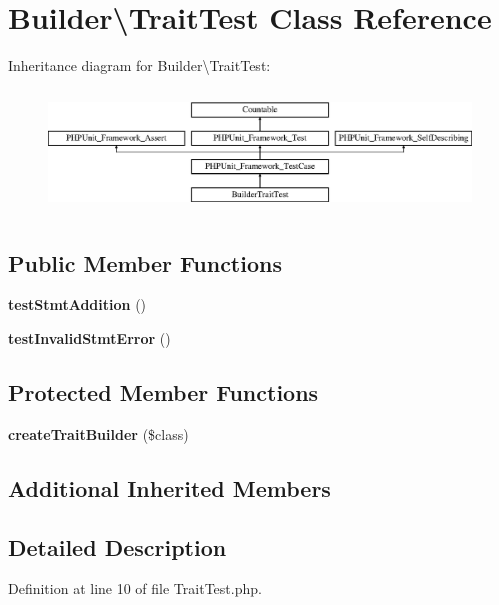 \section{Builder\textbackslash{}Trait\+Test Class Reference}
\label{class_php_parser_1_1_builder_1_1_trait_test}
Inheritance diagram for Builder\textbackslash{}Trait\+Test\+:\begin{figure}[H]
\begin{center}
\leavevmode
\includegraphics[height=3.303835cm]{class_php_parser_1_1_builder_1_1_trait_test}
\end{center}
\end{figure}
\subsection*{Public Member Functions}
\begin{DoxyCompactItemize}
\item 
{\bf test\+Stmt\+Addition} ()
\item 
{\bf test\+Invalid\+Stmt\+Error} ()
\end{DoxyCompactItemize}
\subsection*{Protected Member Functions}
\begin{DoxyCompactItemize}
\item 
{\bf create\+Trait\+Builder} (\$class)
\end{DoxyCompactItemize}
\subsection*{Additional Inherited Members}


\subsection{Detailed Description}


Definition at line 10 of file Trait\+Test.\+php.



